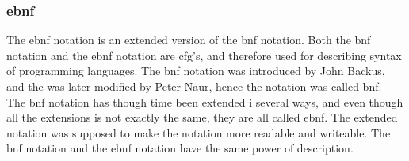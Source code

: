 \subsubsection*{\ac{ebnf}}
The \ac{ebnf} notation is an extended version of the \ac{bnf} notation. Both the \ac{bnf} notation and the \ac{ebnf} notation are \ac{cfg}'s, and therefore used for describing syntax of programming languages. The \ac{bnf} notation was introduced by John Backus, and the was later modified by Peter Naur, hence the notation was called \ac{bnf}. \\
The \ac{bnf} notation has though time been extended i several ways, and even though all the extensions is not exactly the same, they are all called \ac{ebnf}. The extended notation was supposed to make the notation more readable and writeable. The \ac{bnf} notation and the \ac{ebnf} notation have the same power of description. \cite{concepts_prog_lang}



